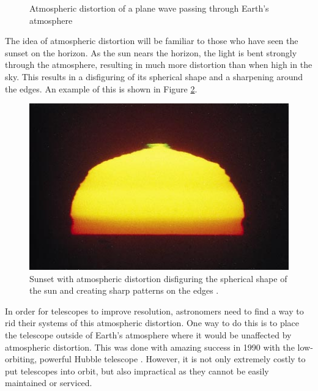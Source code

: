 \begin{figure}[ht]
  \centering
  
  \caption{Atmospheric distortion of a plane wave passing through Earth's atmosphere}
  \label{fig:atmosphericdistortion}
\end{figure}

The idea of atmospheric distortion will be familiar to those who have seen the sunset on the horizon. As the sun nears the horizon, the light is bent strongly through the atmosphere, resulting in much more distortion than when high in the sky. This results in a disfiguring of its spherical shape and a sharpening around the edges. An example of this is shown in Figure \ref{fig:sunset}.

\begin{figure}[t]
  \centering
  \includegraphics[width = .8\textwidth]{Images/sunset.jpg}
  \caption{Sunset with atmospheric distortion disfiguring the spherical shape of the sun and creating sharp patterns on the edges \protect\cite{sunset}.}
  \label{fig:sunset}
\end{figure}

In order for telescopes to improve resolution, astronomers need to find a way to rid their systems of this atmospheric distortion. One way to do this is to place the telescope outside of Earth's atmosphere where it would be unaffected by atmospheric distortion. This was done with amazing success in 1990 with the low-orbiting, powerful Hubble telescope \cite{Okolski}. However, it is not only extremely costly to put telescopes into orbit, but also impractical as they cannot be easily maintained or serviced.


